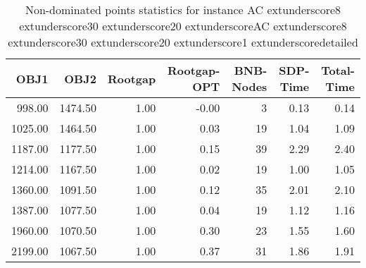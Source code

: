 \begin{table}
\caption{Non-dominated points statistics for instance AC	extunderscore8	extunderscore30	extunderscore20	extunderscoreAC	extunderscore8	extunderscore30	extunderscore20	extunderscore1	extunderscoredetailed}
\label{tab:stats/AC_8_30_20_AC_8_30_20_1_detailed}
\begin{tabular}{rrrrrrr}
\toprule
OBJ1 & OBJ2 & Rootgap & Rootgap-OPT & BNB-Nodes & SDP-Time & Total-Time \\
\midrule
998.00 & 1474.50 & 1.00 & -0.00 & 3 & 0.13 & 0.14 \\
1025.00 & 1464.50 & 1.00 & 0.03 & 19 & 1.04 & 1.09 \\
1187.00 & 1177.50 & 1.00 & 0.15 & 39 & 2.29 & 2.40 \\
1214.00 & 1167.50 & 1.00 & 0.02 & 19 & 1.00 & 1.05 \\
1360.00 & 1091.50 & 1.00 & 0.12 & 35 & 2.01 & 2.10 \\
1387.00 & 1077.50 & 1.00 & 0.04 & 19 & 1.12 & 1.16 \\
1960.00 & 1070.50 & 1.00 & 0.30 & 23 & 1.55 & 1.60 \\
2199.00 & 1067.50 & 1.00 & 0.37 & 31 & 1.86 & 1.91 \\
\bottomrule
\end{tabular}
\end{table}
